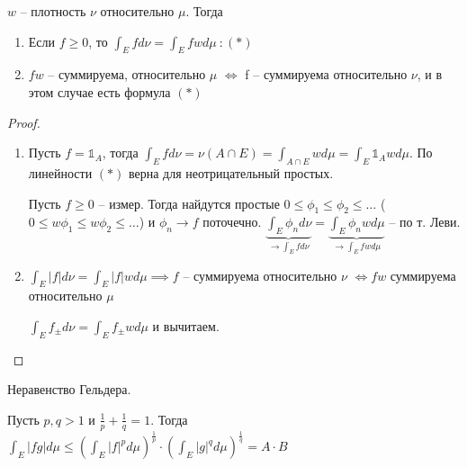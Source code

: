 \begin{theorem}
    $w$ --  плотность $\nu$ относительно $\mu$. Тогда 

    \begin{enumerate}
        \item Если $f \geq 0$, то $\int_E f d \nu = \int_E f w d \mu \ : (*)$
        \item $fw$ -- суммируема, относительно $\mu$ $\Leftrightarrow$ f -- суммируема относительно $\nu$, и в этом случае есть формула $(*)$
    \end{enumerate}
\end{theorem}
\begin{proof}
    \begin{enumerate}
        \item {
            Пусть $f = \mathbb{1}_A$, тогда $\int_E f d \nu = \nu (A \cap E) = \int_{A \cap E} w d \mu = \int_E \mathbb{1}_A w d \mu$. По линейности $(*)$ верна для неотрицательный простых.

            Пусть $f \geq 0$ -- измер. Тогда найдутся простые $0 \leq \phi_1 \leq \phi_2 \leq \dots$ ($0 \leq w \phi_1 \leq w \phi_2 \leq \dots$) и $\phi_n \rightarrow f$ поточечно. $\underbrace{\int_E \phi_n d \nu}_{\rightarrow \int_E f d \nu} = \underbrace{\int_E \phi_n w d \mu}_{\rightarrow \int_E f w d \mu}$ -- по т. Леви.
        }
        \item {
            $\int_E |f| d \nu = \int_E |f| w d \mu \implies f$ -- суммируема относительно $\nu$ $\Leftrightarrow f w$ суммируема относительно $\mu$

            $\int_E f_{\pm} d \nu = \int_E f_{\pm} w d \mu$ и вычитаем.
        }
    \end{enumerate}
\end{proof}
\begin{properties}
    Неравенство Гельдера.

    Пусть $p, q > 1$ и $\frac{1}{p} + \frac{1}{q} = 1$. Тогда $\int_E |fg|d \mu \leq \left(\int_E |f|^p d \mu\right)^{\frac{1}{p}} \cdot \left(\int_E |g|^q d \mu\right)^{\frac{1}{q}} = A \cdot B$
\end{properties}
